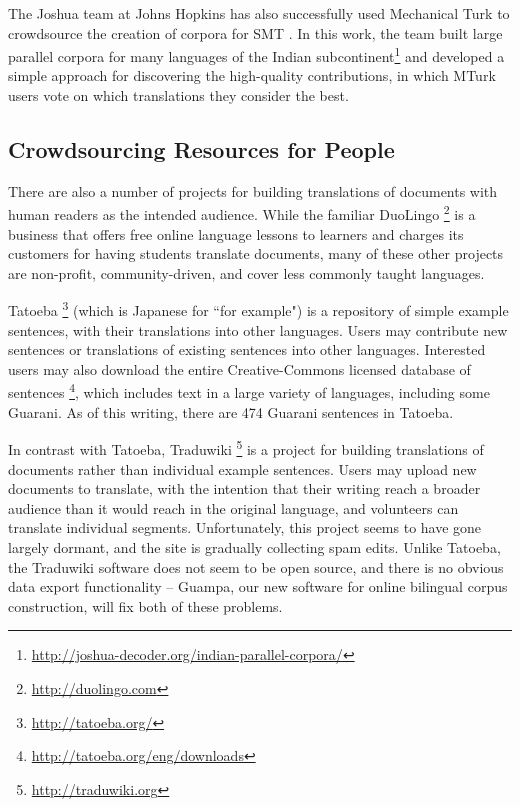 The Joshua team at Johns Hopkins has also successfully used Mechanical Turk to
crowdsource the creation of corpora for SMT
\cite{post-callisonburch-osborne:2012:WMT}. In this work, the team built
large parallel corpora for many languages of the Indian
subcontinent\footnote{\url{http://joshua-decoder.org/indian-parallel-corpora/}}
and developed a simple approach for discovering the high-quality contributions,
in which MTurk users vote on which translations they consider the best.


\subsection{Crowdsourcing Resources for People}

There are also a number of projects for building translations of documents with
human readers as the intended audience.
While the familiar DuoLingo \footnote{\url{http://duolingo.com}} is a business
that offers free online language lessons to learners and charges its customers
for having students translate documents, many of these other projects are
non-profit, community-driven, and cover less commonly taught languages.

Tatoeba \footnote{\url{http://tatoeba.org/}} (which is Japanese for ``for
example") is a repository of simple example sentences, with their translations
into other languages. Users may contribute new sentences or translations of
existing sentences into other languages. Interested users may also download the
entire Creative-Commons licensed database of sentences
\footnote{\url{http://tatoeba.org/eng/downloads}}, which includes text in a
large variety of languages, including some Guarani. As of this writing, there
are 474 Guarani sentences in Tatoeba.

In contrast with Tatoeba, Traduwiki \footnote{\url{http://traduwiki.org}} is a
project for building translations of documents rather than individual example
sentences. Users may upload new documents to translate, with the intention that
their writing reach a broader audience than it would reach in the original
language, and volunteers can translate individual segments. Unfortunately, this
project seems to have gone largely dormant, and the site is gradually
collecting spam edits. Unlike Tatoeba, the Traduwiki software does not seem to
be open source, and there is no obvious data export functionality -- Guampa,
our new software for online bilingual corpus construction, will fix both of
these problems.

